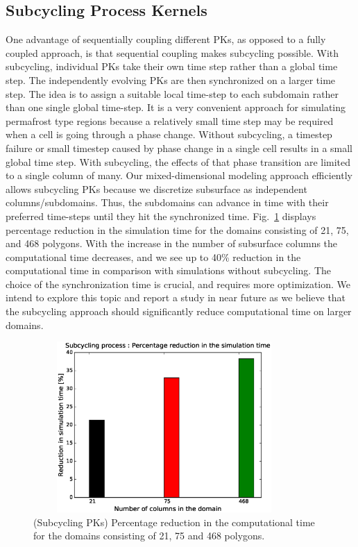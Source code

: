 \documentclass[review]{elsarticle}
\begin{document}
\subsection{Subcycling Process Kernels}
One advantage of sequentially coupling different PKs, as opposed to a fully coupled approach, is that sequential coupling makes subcycling possible. With subcycling, individual PKs take their own time step rather than a global time step. The independently evolving PKs are then synchronized on a larger time step. The idea is to assign a suitable local time-step to each subdomain rather than one single global time-step. It is a very convenient approach for simulating permafrost type regions because a relatively small time step may be required when a cell is going through a phase change. Without subcycling, a timestep failure or small timestep caused by phase change in a single cell results in a small global time step. With subcycling, the effects of that phase transition are limited to a single column of many.  Our mixed-dimensional modeling approach efficiently allows subcycling PKs because we discretize subsurface as independent columns/subdomains. Thus, the subdomains can advance in time with their preferred time-steps until they hit the synchronized time. Fig.~\ref{subcycle-time-reduciton} displays percentage reduction in the simulation time for the domains consisting of 21, 75, and 468 polygons. With the increase in the number of subsurface columns the computational time decreases, and we see up to 40\% reduction in the computational time in comparison with simulations without subcycling. The choice of the synchronization time is crucial, and requires more optimization. We intend to explore this topic and report a study in near future as we believe that the subcycling approach should significantly reduce computational time on larger domains.

\begin{figure}[!htpb]
\centering
\includegraphics[height = 6.5cm, width=10cm]{figures/subcycle-time-reduciton.eps}
\caption{(Subcycling PKs) Percentage reduction in the computational time for the domains consisting of 21, 75 and 468 polygons. }
\label{subcycle-time-reduciton}
\end{figure}
\end{document}
